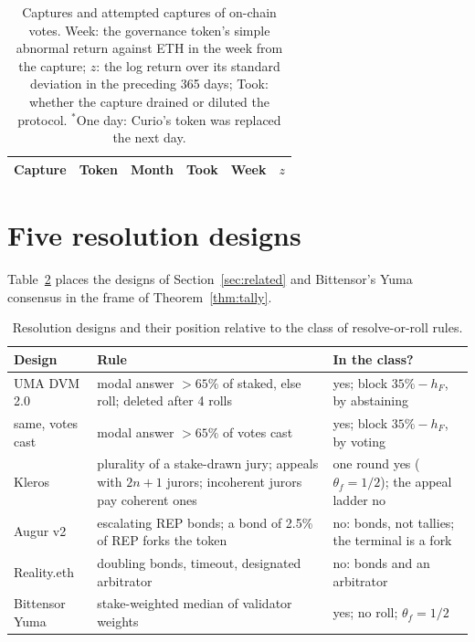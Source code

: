 \documentclass[conference,compsoc]{IEEEtran}
\newcommand{\hF}{h_{F}}
\begin{document}
\begin{table}[t]
\centering
\caption{Captures and attempted captures of on-chain votes. Week: the governance token's simple abnormal return against ETH in the week from the capture; $z$: the log return over its standard deviation in the preceding 365 days; Took: whether the capture drained or diluted the protocol. $^{*}$One day: Curio's token was replaced the next day.}
\label{tab:delta}
\footnotesize
\setlength{\tabcolsep}{4pt}
\begin{tabular}{@{}lllcrr@{}}
\toprule
Capture & Token & Month & Took & Week & $z$ \\
\midrule

\end{tabular}
\end{table}

\section{Five resolution designs}
\label{app:deployments}
Table~\ref{tab:deployments} places the designs of Section~\ref{sec:related} and Bittensor's Yuma consensus in the frame of Theorem~\ref{thm:tally}.

\begin{table}[t]
\centering
\caption{Resolution designs and their position relative to the class of resolve-or-roll rules.}
\label{tab:deployments}
\footnotesize
\setlength{\tabcolsep}{1.5pt}
\begin{tabular}{@{}p{1.45cm}p{3.8cm}p{3.05cm}@{}}
\toprule
Design & Rule & In the class? \\
\midrule
UMA DVM 2.0 & modal answer $> 65\%$ of staked, else roll; deleted after 4 rolls & yes; block $35\% - \hF$, by abstaining \\
same, votes cast & modal answer $> 65\%$ of votes cast & yes; block $35\% - \hF$, by voting \\
Kleros & plurality of a stake-drawn jury; appeals with $2n+1$ jurors; incoherent jurors pay coherent ones & one round yes ($\theta_f = 1/2$); the appeal ladder no \\
Augur v2 & escalating REP bonds; a bond of 2.5\% of REP forks the token & no: bonds, not tallies; the terminal is a fork \\
Reality.eth & doubling bonds, timeout, designated arbitrator & no: bonds and an arbitrator \\
Bittensor Yuma & stake-weighted median of validator weights & yes; no roll; $\theta_f = 1/2$ \\
\bottomrule
\end{tabular}
\end{table}
\end{document}
